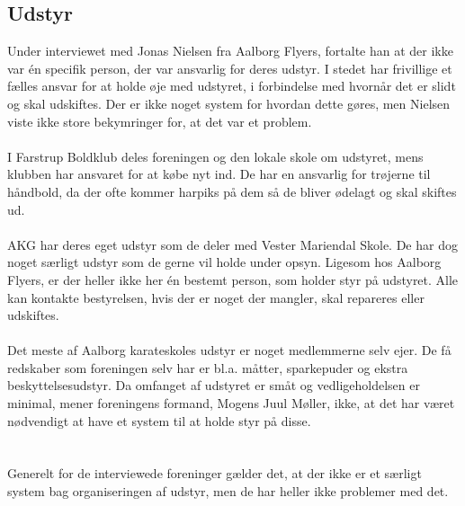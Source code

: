 \subsection*{Udstyr}
Under interviewet med Jonas Nielsen fra Aalborg Flyers, fortalte han at der ikke var én specifik person, der var ansvarlig for deres udstyr. I stedet har frivillige et fælles ansvar for at holde øje med udstyret, i forbindelse med hvornår det er slidt og skal udskiftes. Der er ikke noget system for hvordan dette gøres, men Nielsen viste ikke store bekymringer for, at det var et problem.
\\\\
I Farstrup Boldklub deles foreningen og den lokale skole om udstyret, mens klubben har ansvaret for at købe nyt ind. De har en ansvarlig for trøjerne til håndbold, da der ofte kommer harpiks på dem så de bliver ødelagt og skal skiftes ud.
\\\\
AKG har deres eget udstyr som de deler med Vester Mariendal Skole. De har dog noget særligt udstyr som de gerne vil holde under opsyn. Ligesom hos Aalborg Flyers, er der heller ikke her én bestemt person, som holder styr på udstyret. Alle kan kontakte bestyrelsen, hvis der er noget der mangler, skal repareres eller udskiftes. 
\\\\
\clearpage
Det meste af Aalborg karateskoles udstyr er noget medlemmerne selv ejer. De få redskaber som foreningen selv har er bl.a. måtter, sparkepuder og ekstra beskyttelsesudstyr. Da omfanget af udstyret er småt og vedligeholdelsen er minimal, mener foreningens formand, Mogens Juul Møller, ikke, at det har været nødvendigt at have et system til at holde styr på disse.
\\\\\\
Generelt for de interviewede foreninger gælder det, at der ikke er et særligt system bag organiseringen af udstyr, men de har heller ikke problemer med det. 

